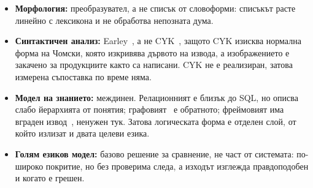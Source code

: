 \begin{itemize}[topsep=2pt,itemsep=1pt,leftmargin=*]
\item \textbf{Морфология:} преобразувател, а не списък от словоформи: списъкът расте
      линейно с лексикона и не обработва непозната дума.
\item \textbf{Синтактичен анализ:} Earley~\cite{earley1970parsing}, а не
      CYK~\cite{younger1967cyk}, защото CYK изисква нормална форма на Чомски, която
      изкривява дървото на извода, а изображението е закачено за продукциите както са
      написани. CYK не е реализиран, затова измерена съпоставка по време няма.
\item \textbf{Модел на знанието:} междинен. Релационният е близък до SQL, но описва слабо
      йерархията от понятия; графовият~\cite{w3c2013sparql} е обратното; фреймовият има
      вграден извод~\cite{sowa2000kr}, ненужен тук. Затова логическата форма е отделен
      слой, от който излизат и двата целеви езика.
\item \textbf{Голям езиков модел:} базово решение за сравнение, не част от системата:
      по-широко покритие, но без проверима следа, а изходът изглежда правдоподобен и
      когато е грешен.
\end{itemize}
